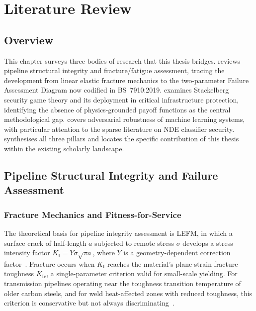 
\chapter{Literature Review}
\label{ch:literature}

\section{Overview}
\label{sec:lit_overview}

This chapter surveys three bodies of research that this thesis bridges.
 reviews pipeline structural integrity and
fracture/fatigue assessment, tracing the development from linear elastic
fracture mechanics to the two-parameter Failure Assessment Diagram now
codified in BS~7910:2019.   examines Stackelberg
security game theory and its deployment in critical infrastructure
protection, identifying the absence of physics-grounded payoff functions
as the central methodological gap.   covers adversarial
robustness of machine learning systems, with particular attention to the
sparse literature on NDE classifier security.  
synthesises all three pillars and locates the specific contribution of
this thesis within the existing scholarly landscape.

\section{Pipeline Structural Integrity and Failure Assessment}
\label{sec:lit_integrity}

\subsection{Fracture Mechanics and Fitness-for-Service}
\label{subsec:lit_fracture}

The theoretical basis for pipeline integrity assessment is \ac{LEFM},
in which a surface crack of half-length $a$ subjected to remote stress
$\sigma$ develops a stress intensity factor $K_\mathrm{I} = Y\sigma\sqrt{\pi a}$,
where $Y$ is a geometry-dependent correction factor~\cite{Anderson2005}.
Fracture occurs when $K_\mathrm{I}$ reaches the material's plane-strain
fracture toughness $K_\mathrm{Ic}$, a single-parameter criterion valid
for small-scale yielding.  For transmission pipelines operating near the
toughness transition temperature of older carbon steels, and for weld
heat-affected zones with reduced toughness, this criterion is conservative
but not always discriminating~\cite{Francis2014}.

